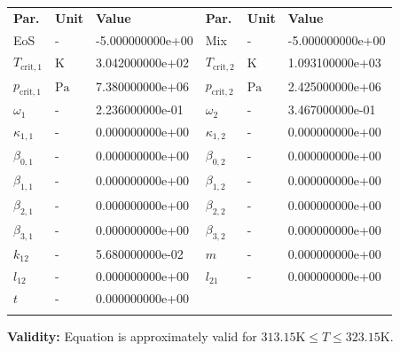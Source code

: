\begin{longtable}[l]{lll|lll}
\toprule
\addlinespace
\textbf{Par.} & \textbf{Unit} & \textbf{Value} &	\textbf{Par.} & \textbf{Unit} & \textbf{Value} \\
\addlinespace
\midrule
\endhead

\bottomrule
\endfoot
\bottomrule
\endlastfoot
\addlinespace

EoS & - & -5.000000000e+00 & Mix & - & -5.000000000e+00 \\
$T_\mathrm{crit,1}$ & $\si{\kelvin}$ & 3.042000000e+02 & $T_\mathrm{crit,2}$ & $\si{\kelvin}$ & 1.093100000e+03 \\
$p_\mathrm{crit,1}$ & $\si{\pascal}$ & 7.380000000e+06 & $p_\mathrm{crit,2}$ & $\si{\pascal}$ & 2.425000000e+06 \\
$\omega_{1}$ & - & 2.236000000e-01 & $\omega_{2}$ & - & 3.467000000e-01 \\
$\kappa_{1,1}$ & - & 0.000000000e+00 & $\kappa_{1,2}$ & - & 0.000000000e+00 \\
$\beta_{0,1}$ & - & 0.000000000e+00 & $\beta_{0,2}$ & - & 0.000000000e+00 \\
$\beta_{1,1}$ & - & 0.000000000e+00 & $\beta_{1,2}$ & - & 0.000000000e+00 \\
$\beta_{2,1}$ & - & 0.000000000e+00 & $\beta_{2,2}$ & - & 0.000000000e+00 \\
$\beta_{3,1}$ & - & 0.000000000e+00 & $\beta_{3,2}$ & - & 0.000000000e+00 \\
$k_{12}$ & - & 5.680000000e-02 & $m$ & - & 0.000000000e+00 \\
$l_{12}$ & - & 0.000000000e+00 & $l_{21}$ & - & 0.000000000e+00 \\
$t$ & - & 0.000000000e+00 & & & \\

\addlinespace\end{longtable}

\textbf{Validity:}
\newline
Equation is approximately valid for $313.15 \si{\kelvin} \leq T \leq 323.15 \si{\kelvin}$.
\newline

